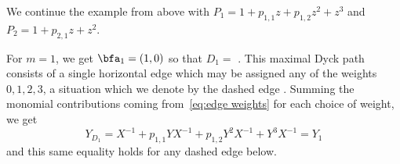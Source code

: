 
 \begin{example}
 We continue the example from above with $P_1=1+p_{1,1}z+p_{1,2}z^2+z^3$ and $P_2=1+p_{2,1}z+z^2$.
 
 For $m=1$, we get $\bfa_1=(1,0)$ so that $D_1=$ 
 .
 This maximal Dyck path consists of a single horizontal edge which may be assigned any of the weights $0,1,2,3$, a situation which we denote by the dashed edge
 .
 Summing the monomial contributions coming from~\eqref{eq:edge weights} for each choice of weight, we get
 \[Y_{D_1}=X^{-1}+p_{1,1}YX^{-1}+p_{1,2}Y^2X^{-1}+Y^3X^{-1}=Y_1\]
 and this same equality holds for any dashed edge below.


\end{example}
